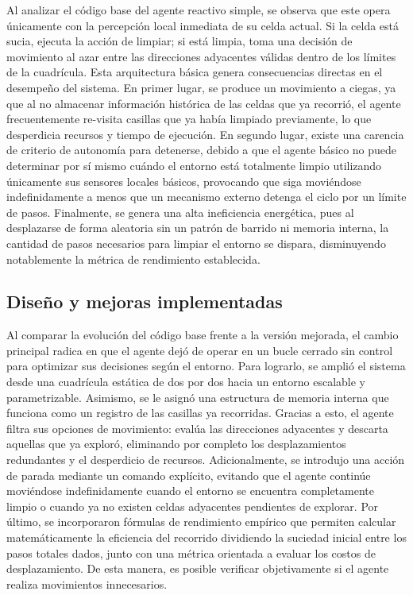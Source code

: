 \documentclass[
  spanish,
  spanish,
  es-tabla,
  twocolumn]{llncs}
\begin{document}
Al analizar el código base del agente reactivo simple, se observa que
este opera únicamente con la percepción local inmediata de su celda
actual. Si la celda está sucia, ejecuta la acción de limpiar; si está
limpia, toma una decisión de movimiento al azar entre las direcciones
adyacentes válidas dentro de los límites de la cuadrícula. Esta
arquitectura básica genera consecuencias directas en el desempeño del
sistema. En primer lugar, se produce un movimiento a ciegas, ya que al
no almacenar información histórica de las celdas que ya recorrió, el
agente frecuentemente re-visita casillas que ya había limpiado
previamente, lo que desperdicia recursos y tiempo de ejecución. En
segundo lugar, existe una carencia de criterio de autonomía para
detenerse, debido a que el agente básico no puede determinar por sí
mismo cuándo el entorno está totalmente limpio utilizando únicamente sus
sensores locales básicos, provocando que siga moviéndose indefinidamente
a menos que un mecanismo externo detenga el ciclo por un límite de
pasos. Finalmente, se genera una alta ineficiencia energética, pues al
desplazarse de forma aleatoria sin un patrón de barrido ni memoria
interna, la cantidad de pasos necesarios para limpiar el entorno se
dispara, disminuyendo notablemente la métrica de rendimiento
establecida.

\subsection{Diseño y mejoras
implementadas}\label{diseuxf1o-y-mejoras-implementadas}

Al comparar la evolución del código base frente a la versión mejorada,
el cambio principal radica en que el agente dejó de operar en un bucle
cerrado sin control para optimizar sus decisiones según el entorno. Para
lograrlo, se amplió el sistema desde una cuadrícula estática de dos por
dos hacia un entorno escalable y parametrizable. Asimismo, se le asignó
una estructura de memoria interna que funciona como un registro de las
casillas ya recorridas. Gracias a esto, el agente filtra sus opciones de
movimiento: evalúa las direcciones adyacentes y descarta aquellas que ya
exploró, eliminando por completo los desplazamientos redundantes y el
desperdicio de recursos. Adicionalmente, se introdujo una acción de
parada mediante un comando explícito, evitando que el agente continúe
moviéndose indefinidamente cuando el entorno se encuentra completamente
limpio o cuando ya no existen celdas adyacentes pendientes de explorar.
Por último, se incorporaron fórmulas de rendimiento empírico que
permiten calcular matemáticamente la eficiencia del recorrido dividiendo
la suciedad inicial entre los pasos totales dados, junto con una métrica
orientada a evaluar los costos de desplazamiento. De esta manera, es
posible verificar objetivamente si el agente realiza movimientos
innecesarios.
\end{document}
